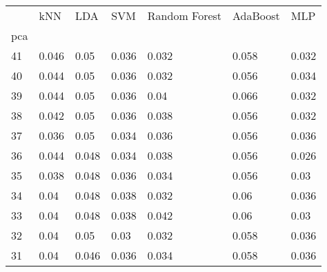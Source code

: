 \begin{tabular}{lllllll}
\toprule
{} &    kNN &    LDA &    SVM & Random Forest & AdaBoost &    MLP \\
pca &        &        &        &               &          &        \\
\midrule
41  &  0.046 &   0.05 &  0.036 &         0.032 &    0.058 &  0.032 \\
40  &  0.044 &   0.05 &  0.036 &         0.032 &    0.056 &  0.034 \\
39  &  0.044 &   0.05 &  0.036 &          0.04 &    0.066 &  0.032 \\
38  &  0.042 &   0.05 &  0.036 &         0.038 &    0.056 &  0.032 \\
37  &  0.036 &   0.05 &  0.034 &         0.036 &    0.056 &  0.036 \\
36  &  0.044 &  0.048 &  0.034 &         0.038 &    0.056 &  0.026 \\
35  &  0.038 &  0.048 &  0.036 &         0.034 &    0.056 &   0.03 \\
34  &   0.04 &  0.048 &  0.038 &         0.032 &     0.06 &  0.036 \\
33  &   0.04 &  0.048 &  0.038 &         0.042 &     0.06 &   0.03 \\
32  &   0.04 &   0.05 &   0.03 &         0.032 &    0.058 &  0.036 \\
31  &   0.04 &  0.046 &  0.036 &         0.034 &    0.058 &  0.036 \\
\bottomrule
\end{tabular}
